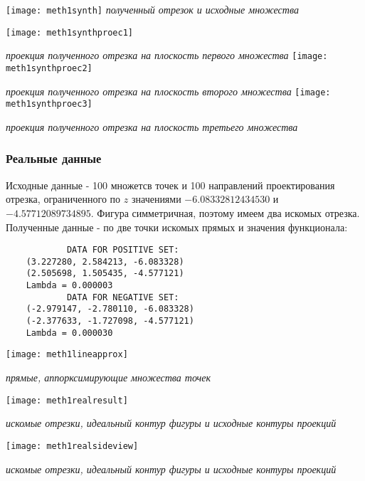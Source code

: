 \begin{center}
	\texttt{[image: meth1synth]}
	\textit{полученный отрезок и исходные множества}
\end{center}

\begin{center}
	\texttt{[image: meth1synthproec1]}

	\textit{проекция полученного отрезка на плоскость первого множества}
	\texttt{[image: meth1synthproec2]}

	\textit{проекция полученного отрезка на плоскость второго множества}
	\texttt{[image: meth1synthproec3]}
	
	\textit{проекция полученного отрезка на плоскость третьего множества}
\end{center}

\subsubsection{Реальные данные}\label{math2:error:real}

Исходные данные - 100 множетсв точек и 100 направлений проектирования отрезка, ограниченного по $z$ значениями $-6.08332812434530$ и $-4.57712089734895$. Фигура симметричная, поэтому имеем два искомых отрезка.\\

Полученные данные - по две точки искомых прямых и значения функционала:

\begin{verbatim}
			DATA FOR POSITIVE SET:
	(3.227280, 2.584213, -6.083328)
	(2.505698, 1.505435, -4.577121)
	Lambda = 0.000003
			DATA FOR NEGATIVE SET:
	(-2.979147, -2.780110, -6.083328)
	(-2.377633, -1.727098, -4.577121)
	Lambda = 0.000030
\end{verbatim}

\begin{center}
	\texttt{[image: meth1lineapprox]}

	\textit{прямые, аппорксимирующие множества точек}

	\texttt{[image: meth1realresult]}

	\textit{искомые отрезки, идеальный контур фигуры и исходные контуры проекций}

	\texttt{[image: meth1realsideview]}

	\textit{искомые отрезки, идеальный контур фигуры и исходные контуры проекций}
\end{center}

\newpage